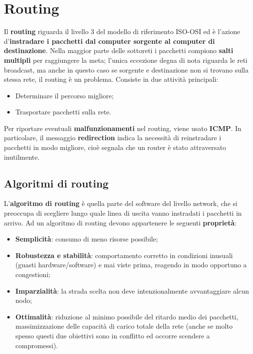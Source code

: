 \section{Routing}
    Il \textbf{routing} riguarda il livello 3 del modello di riferimento ISO-OSI ed è l’azione d’\textbf{instradare i
    pacchetti dal computer sorgente al computer di destinazione}. Nella maggior parte delle
    sottoreti i pacchetti compiono \textbf{salti multipli} per raggiungere la meta; l’unica eccezione degna
    di nota riguarda le reti broadcast, ma anche in questo caso se sorgente e destinazione non si
    trovano sulla stessa rete, il routing è un problema. Consiste in due attività principali:\\
    
    \begin{itemize}
        \item Determinare il percorso migliore;
        \item Trasportare pacchetti sulla rete.
    \end{itemize}

    Per riportare eventuali \textbf{malfunzionamenti} nel routing, viene usato \textbf{ICMP}. In particolare, il
    messaggio \textbf{redirection} indica la necessità di reinstradare i pacchetti in modo migliore, cioè
    segnala che un router è stato attraversato inutilmente.

        \subsection{Algoritmi di routing}
        L’\textbf{algoritmo di routing} è quella parte del software del livello network, che si preoccupa di
        scegliere lungo quale linea di uscita vanno instradati i pacchetti in arrivo.
        Ad un algoritmo di routing devono appartenere le seguenti \textbf{proprietà}:
        
        \begin{itemize}
            \item \textbf{Semplicità}: consumo di meno risorse possibile;
            \item \textbf{Robustezza e stabilità}: comportamento corretto in condizioni inusuali (guasti
            hardware/software) e mai viste prima, reagendo in modo opportuno a congestioni;
            \item \textbf{Imparzialità}: la strada scelta non deve intenzionalmente avvantaggiare alcun nodo;
            \item \textbf{Ottimalità}: riduzione al minimo possibile del ritardo medio dei pacchetti,
            massimizzazione delle capacità di carico totale della rete (anche se molto spesso questi
            due obiettivi sono in conflitto ed occorre scendere a compromessi).
        \end{itemize}
        
